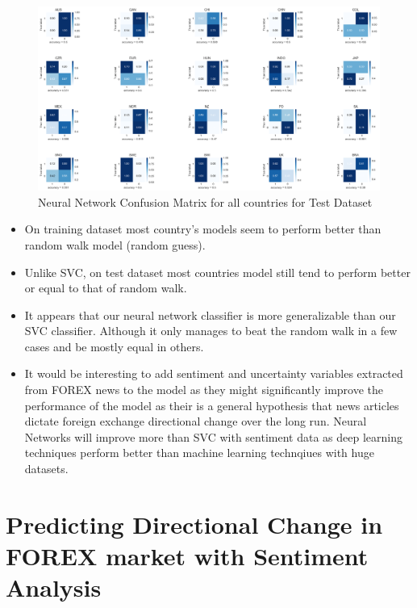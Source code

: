 \documentclass{article}
\begin{document}
\begin{figure}[H]
    \centering
    \hspace*{-1.25in}
    \includegraphics[scale = .30]{images/direction/n_cm_test.png}
    \caption{Neural Network Confusion Matrix for all countries for Test Dataset}
    \label{simulationfigure}
\end{figure}

\begin{itemize}
  \item On training dataset most country's models seem to perform better than random walk model (random guess).
  \item Unlike SVC, on test dataset most countries model still tend to perform better or equal to that of random walk.
  \item It appears that our neural network classifier is more generalizable than our SVC classifier. Although it only manages to beat the random walk in a few cases and be mostly
        equal in others.
  \item It would be interesting to add sentiment and uncertainty variables extracted from FOREX news to the model as they might significantly improve the performance
        of the model as their is a general hypothesis that news articles dictate foreign exchange directional change over the long run. Neural Networks will improve more
        than SVC with sentiment data as deep learning techniques perform better than machine learning technqiues with huge datasets.
\end{itemize}

\section{Predicting Directional Change in FOREX market with Sentiment Analysis}
\vspace*{2mm}
\end{document}
